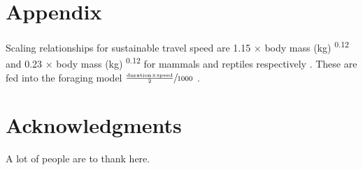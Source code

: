 \documentclass[a4paper,12pt]{article}
\begin{document}
\section*{Appendix}
Scaling relationships for sustainable travel speed are 1.15 $\times$ body mass (kg) \textsuperscript{0.12} and 0.23 $\times$ body mass (kg) \textsuperscript{0.12} for mammals and reptiles respectively \citep{ruxton2004obligate}.
These are fed into the foraging model $\sfrac{\frac{\text{duration} \times \text{speed}}{2}}{1000}$ \citep{Enstipp2006Energetics}.

\section*{Acknowledgments}

A lot of people are to thank here.


\newpage



\end{document}
